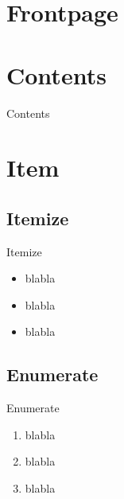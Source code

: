 

\section*{Frontpage}

\begin{frame}
  \maketitle
\end{frame}


\section*{Contents}

\begin{frame}{Contents}
  \tableofcontents
\end{frame}


\section{Item}

\subsection{Itemize}
  
\begin{frame}{Itemize}
  \begin{itemize}
  \item<alert@1> blabla
  \item<alert@2> blabla
  \item<alert@3> blabla
  \end{itemize}
\end{frame}

\subsection{Enumerate}

\begin{frame}{Enumerate}
  \begin{enumerate}
  \item blabla
  \item blabla
  \item blabla
  \end{enumerate}
\end{frame}

